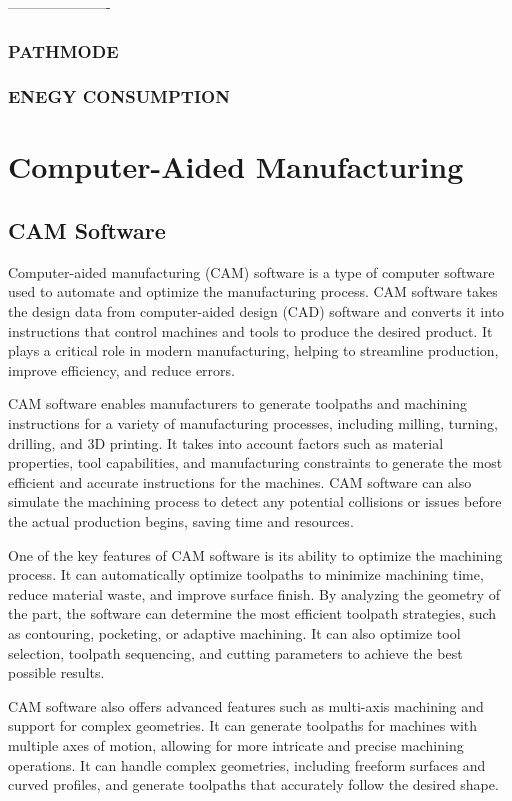 ----------------------





\subsubsection{PATHMODE}

\subsubsection{ENEGY CONSUMPTION}


\section{Computer-Aided Manufacturing}\label{CAMmain}
\subsection{CAM Software}
Computer-aided manufacturing (CAM) software is a type of computer software used to automate and optimize the manufacturing process. CAM software takes the design data from computer-aided design (CAD) software and converts it into instructions that control machines and tools to produce the desired product. It plays a critical role in modern manufacturing, helping to streamline production, improve efficiency, and reduce errors.

CAM software enables manufacturers to generate toolpaths and machining instructions for a variety of manufacturing processes, including milling, turning, drilling, and 3D printing. It takes into account factors such as material properties, tool capabilities, and manufacturing constraints to generate the most efficient and accurate instructions for the machines. CAM software can also simulate the machining process to detect any potential collisions or issues before the actual production begins, saving time and resources.

One of the key features of CAM software is its ability to optimize the machining process. It can automatically optimize toolpaths to minimize machining time, reduce material waste, and improve surface finish. By analyzing the geometry of the part, the software can determine the most efficient toolpath strategies, such as contouring, pocketing, or adaptive machining. It can also optimize tool selection, toolpath sequencing, and cutting parameters to achieve the best possible results.

CAM software also offers advanced features such as multi-axis machining and support for complex geometries. It can generate toolpaths for machines with multiple axes of motion, allowing for more intricate and precise machining operations. It can handle complex geometries, including freeform surfaces and curved profiles, and generate toolpaths that accurately follow the desired shape.

